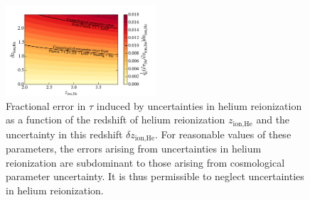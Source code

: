 \documentclass[twocolumn,aps,prd,nofootinbib,showpacs,superscriptaddress]{revtex4-1}
\begin{document}
\begin{figure}[!]
	\centering
	\includegraphics[width=0.5\textwidth,trim=0.5cm 0cm 0.75cm 0.90cm,clip]{figures/HeII_reion.pdf}
	\caption{Fractional error in $\tau$ induced by uncertainties in helium reionization as a function of the redshift of helium reionization $z_\textrm{ion,He}$ and the uncertainty in this redshift $\delta z_\textrm{ion,He}$. For reasonable values of these parameters, the errors arising from uncertainties in helium reionization are subdominant to those arising from cosmological parameter uncertainty. It is thus permissible to neglect uncertainties in helium reionization.}
	\label{fig:HeII_reion_errors}
\end{figure}
\end{document}

